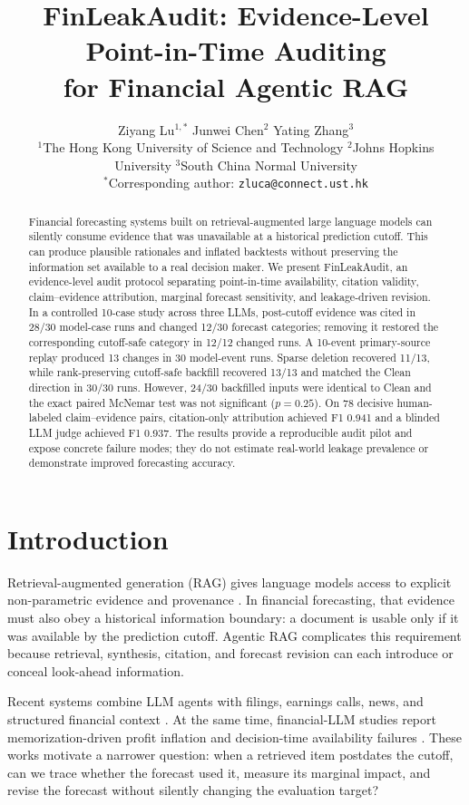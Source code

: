\documentclass[10pt,twocolumn]{article}
\title{FinLeakAudit: Evidence-Level Point-in-Time Auditing\\
for Financial Agentic RAG}
\author{
Ziyang Lu$^{1,*}$ \quad Junwei Chen$^{2}$ \quad Yating Zhang$^{3}$\\
\scriptsize $^{1}$The Hong Kong University of Science and Technology \quad
$^{2}$Johns Hopkins University \quad $^{3}$South China Normal University\\[-1pt]
\scriptsize $^{*}$Corresponding author: \texttt{zluca@connect.ust.hk}
}
\date{}
\newcommand{\system}{FinLeakAudit}
\begin{document}
\raggedbottom
\maketitle

\begin{abstract}
Financial forecasting systems built on retrieval-augmented large language models can
silently consume evidence that was unavailable at a historical prediction cutoff.
This can produce plausible rationales and inflated backtests without preserving the
information set available to a real decision maker. We present \system{}, an
evidence-level audit protocol separating point-in-time availability, citation
validity, claim--evidence attribution, marginal forecast sensitivity, and
leakage-driven revision. In a controlled 10-case study across three LLMs,
post-cutoff evidence was cited in 28/30 model-case runs and changed 12/30 forecast
categories; removing it restored the corresponding cutoff-safe category in 12/12
changed runs. A 10-event primary-source replay produced 13 changes in 30 model-event
runs. Sparse deletion recovered 11/13, while rank-preserving cutoff-safe backfill
recovered 13/13 and matched the Clean direction in 30/30 runs. However, 24/30
backfilled inputs were identical to Clean and the exact paired McNemar test was not
significant ($p=0.25$). On 78 decisive human-labeled claim--evidence pairs,
citation-only attribution achieved F1 0.941 and a blinded LLM judge achieved F1
0.937. The results provide a reproducible audit pilot and expose concrete failure
modes; they do not estimate real-world leakage prevalence or demonstrate improved
forecasting accuracy.
\end{abstract}

\section{Introduction}

Retrieval-augmented generation (RAG) gives language models access to explicit
non-parametric evidence and provenance \cite{lewis2020rag}. In financial forecasting,
that evidence must also obey a historical information boundary: a document is usable
only if it was available by the prediction cutoff. Agentic RAG complicates this
requirement because retrieval, synthesis, citation, and forecast revision can each
introduce or conceal look-ahead information.

Recent systems combine LLM agents with filings, earnings calls, news, and structured
financial context \cite{fatouros2025marketsenseai,li2026carag}. At the same time,
financial-LLM studies report memorization-driven profit inflation and decision-time
availability failures \cite{li2025profitmirage,benhenda2026lookahead,guan2026leakageaware}.
These works motivate a narrower question: when a retrieved item postdates the cutoff,
can we trace whether the forecast used it, measure its marginal impact, and revise the
forecast without silently changing the evaluation target?
\end{document}
